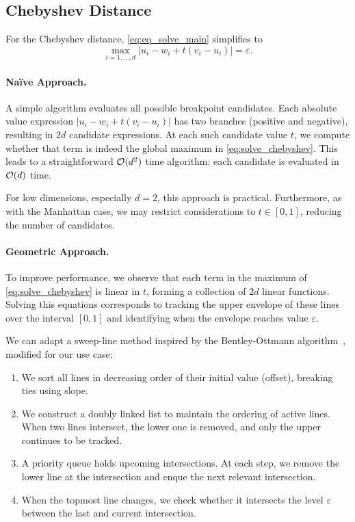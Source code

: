 \subsection{Chebyshev Distance}
\label{subsubsec:eq_chebyshev_distance}
For the Chebyshev distance, \cref{eq:eq_solve_main} simplifies to 
\begin{equation}
  \max_{i = 1,\dots, d} |u_i - w_i + t(v_i - u_i)| = \varepsilon.\label{eq:solve_chebyshev}
\end{equation}

\paragraph{Na\"ive Approach.}
A simple algorithm evaluates all possible breakpoint candidates. Each absolute value expression \(|u_i - w_i + t(v_i - u_i)|\) has two branches (positive and negative), resulting in \(2d\) candidate expressions. At each such candidate value \(t\), we compute whether that term is indeed the global maximum in \cref{eq:solve_chebyshev}. This leads to a straightforward \(\mathcal{O}(d^2)\) time algorithm: each candidate is evaluated in \(\mathcal{O}(d)\) time.

For low dimensions, especially \(d = 2\), this approach is practical. Furthermore, as with the Manhattan case, we may restrict considerations to \(t \in [0, 1]\), reducing the number of candidates.

\paragraph{Geometric Approach. }
To improve performance, we observe that each term in the maximum of \cref{eq:solve_chebyshev} is linear in \(t\), forming a collection of \(2d\) linear functions. Solving this equations corresponds to tracking the upper envelope of these lines over the interval \([0, 1]\) and identifying when the envelope reaches value \(\varepsilon\).

We can adapt a sweep-line method inspired by the Bentley-Ottmann algorithm~\cite{computational_geometry}, modified for our use case: 
\begin{enumerate}
	\item We sort all lines in decreasing order of their initial value (offset), breaking ties using slope.
	\item We construct a doubly linked list to maintain the ordering of active lines. When two lines intersect, the lower one is removed, and only the upper continues to be tracked.
	\item A priority queue holds upcoming intersections. At each step, we remove the lower line at the intersection and enque the next relevant intersection. 
	\item When the topmost line changes, we check whether it intersects the level \(\varepsilon\) between the last and current intersection.
\end{enumerate}

